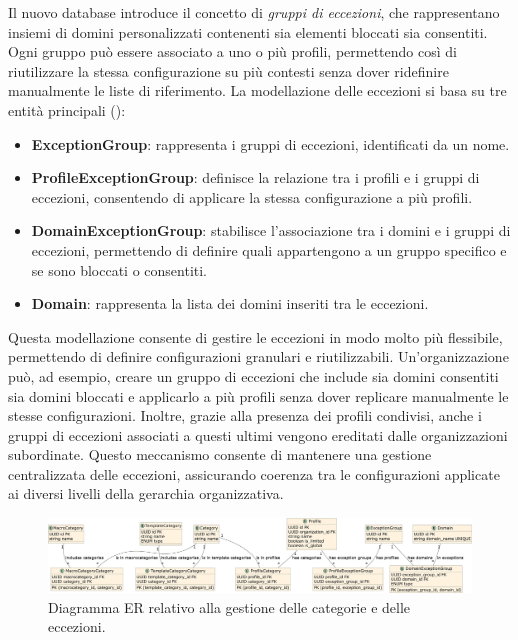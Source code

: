 Il nuovo database introduce il concetto di \emph{gruppi di eccezioni}, che rappresentano insiemi di domini personalizzati contenenti sia elementi bloccati sia consentiti. Ogni gruppo può essere associato a uno o più profili, permettendo così di riutilizzare la stessa configurazione su più contesti senza dover ridefinire manualmente le liste di riferimento. La modellazione delle eccezioni si basa su tre entità principali ():
\begin{itemize}
  \item \textbf{ExceptionGroup}: rappresenta i gruppi di eccezioni, identificati da un nome.
  \item \textbf{ProfileExceptionGroup}: definisce la relazione tra i profili e i gruppi di eccezioni, consentendo di applicare la stessa configurazione a più profili.
  \item \textbf{DomainExceptionGroup}: stabilisce l'associazione tra i domini e i gruppi di eccezioni, permettendo di definire quali appartengono a un gruppo specifico e se sono bloccati o consentiti.
  \item \textbf{Domain}: rappresenta la lista dei domini inseriti tra le eccezioni.
\end{itemize}

Questa modellazione consente di gestire le eccezioni in modo molto più flessibile, permettendo di definire configurazioni granulari e riutilizzabili. Un’organizzazione può, ad esempio, creare un gruppo di eccezioni che include sia domini consentiti sia domini bloccati e applicarlo a più profili senza dover replicare manualmente le stesse configurazioni. Inoltre, grazie alla presenza dei profili condivisi, anche i gruppi di eccezioni associati a questi ultimi vengono ereditati dalle organizzazioni subordinate. Questo meccanismo consente di mantenere una gestione centralizzata delle eccezioni, assicurando coerenza tra le configurazioni applicate ai diversi livelli della gerarchia organizzativa.

\begin{figure}
  \centering
  \includegraphics[width=1\textwidth]{figures/db-category-exceptions.pdf}
  \caption{Diagramma ER relativo alla gestione delle categorie e delle eccezioni.}
  \label{fig:categories-exceptions}
\end{figure}

